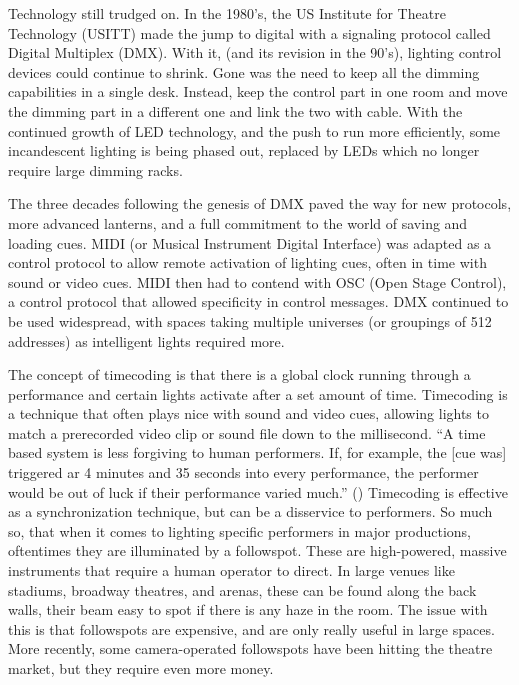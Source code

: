 \documentclass[12pt,twoside]{reedthesis}
\begin{document}
Technology still trudged on. In the 1980’s, the US Institute for Theatre Technology (USITT) made the jump to digital with a signaling protocol called Digital Multiplex (DMX). With it, (and its revision in the 90’s), lighting control devices could continue to shrink. Gone was the need to keep all the dimming capabilities in a single desk. Instead, keep the control part in one room and move the dimming part in a different one and link the two with cable. With the continued growth of LED technology, and the push to run more efficiently, some incandescent lighting is being phased out, replaced by LEDs which no longer require large dimming racks. 

	The three decades following the genesis of DMX paved the way for new protocols, more advanced lanterns, and a full commitment to the world of saving and loading cues. MIDI (or Musical Instrument Digital Interface) was adapted as a control protocol to allow remote activation of lighting cues, often in time with sound or video cues. MIDI then had to contend with OSC (Open Stage Control), a control protocol that allowed specificity in control messages. DMX continued to be used widespread, with spaces taking multiple universes (or groupings of 512 addresses) as intelligent lights required more.
	 
	The concept of timecoding is that there is a global clock running through a performance and certain lights activate after a set amount of time. Timecoding is a technique that often plays nice with sound and video cues, allowing lights to match a prerecorded video clip or sound file down to the millisecond. “A time based system is less forgiving to human performers. If, for example, the [cue was] triggered ar 4 minutes and 35 seconds into every performance, the performer would be out of luck if their performance varied much.” (\cite{huntington_introduction_2023}) Timecoding is effective as a synchronization technique, but can be a disservice to performers. So much so, that when it comes to lighting specific performers in major productions, oftentimes they are illuminated by a followspot. These are high-powered, massive instruments that require a human operator to direct. In large venues like stadiums, broadway theatres, and arenas, these can be found along the back walls, their beam easy to spot if there is any haze in the room. The issue with this is that followspots are expensive, and are only really useful in large spaces. More recently, some camera-operated followspots have been hitting the theatre market, but they require even more money.
	
\end{document}
